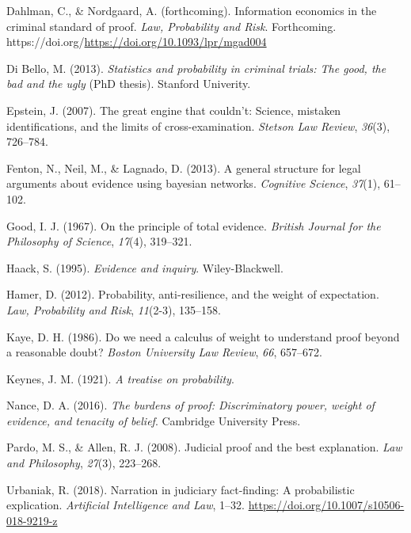 \documentclass[
  10pt,
  dvipsnames,enabledeprecatedfontcommands]{scrartcl}
\newlength{\cslhangindent}
\newlength{\cslentryspacingunit} %
\newenvironment{CSLReferences}[2] %
 {%
  \setlength{\parindent}{0pt}
  \ifodd #1
  \let\oldpar\par
  \def\par{\hangindent=\cslhangindent\oldpar}
  \fi
  \setlength{\parskip}{#2\cslentryspacingunit}
 }%
 {}
\begin{document}
\hypertarget{refs}{}
\begin{CSLReferences}{1}{0}
\leavevmode{}%
Dahlman, C., \& Nordgaard, A. (forthcoming). Information economics in
the criminal standard of proof. \emph{Law, Probability and Risk}.
Forthcoming. https://doi.org/\url{https://doi.org/10.1093/lpr/mgad004}

\leavevmode{}%
Di Bello, M. (2013). \emph{Statistics and probability in criminal
trials: The good, the bad and the ugly} (PhD thesis). Stanford
Univerity.

\leavevmode{}%
Epstein, J. (2007). The great engine that couldn't: Science, mistaken
identifications, and the limits of cross-examination. \emph{Stetson Law
Review}, \emph{36}(3), 726--784.

\leavevmode{}%
Fenton, N., Neil, M., \& Lagnado, D. (2013). A general structure for
legal arguments about evidence using bayesian networks. \emph{Cognitive
Science}, \emph{37}(1), 61--102.

\leavevmode{}%
Good, I. J. (1967). On the principle of total evidence. \emph{British
Journal for the Philosophy of Science}, \emph{17}(4), 319--321.

\leavevmode{}%
Haack, S. (1995). \emph{Evidence and inquiry}. Wiley-Blackwell.

\leavevmode{}%
Hamer, D. (2012). Probability, anti-resilience, and the weight of
expectation. \emph{Law, Probability and Risk}, \emph{11}(2-3), 135--158.

\leavevmode{}%
Kaye, D. H. (1986). Do we need a calculus of weight to understand proof
beyond a reasonable doubt? \emph{Boston University Law Review},
\emph{66}, 657--672.

\leavevmode{}%
Keynes, J. M. (1921). \emph{A treatise on probability}.

\leavevmode{}%
Nance, D. A. (2016). \emph{The burdens of proof: Discriminatory power,
weight of evidence, and tenacity of belief}. Cambridge University Press.

\leavevmode{}%
Pardo, M. S., \& Allen, R. J. (2008). Judicial proof and the best
explanation. \emph{Law and Philosophy}, \emph{27}(3), 223--268.

\leavevmode{}%
Urbaniak, R. (2018). Narration in judiciary fact-finding: A
probabilistic explication. \emph{Artificial Intelligence and Law},
1--32. \url{https://doi.org/10.1007/s10506-018-9219-z}

\end{CSLReferences}
\end{document}
